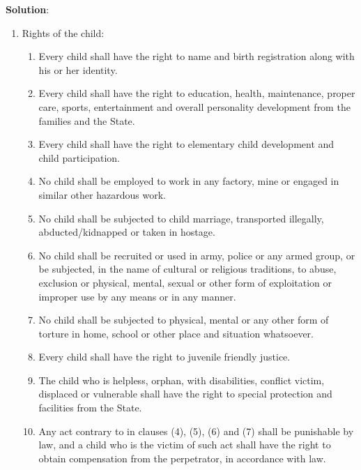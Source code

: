 \documentclass[
  openany]{book}
\newenvironment{solution}{ {\bfseries Solution}:}{}
\begin{document}
\begin{questions}
\begin{solution}
\begin{enumerate}
\item Rights of the child:
\begin{enumerate}
\item Every child shall have the right to name and birth registration along with his or her identity.
\item Every child shall have the right to education, health, maintenance, proper care, sports, entertainment and overall personality development from the families and the State.
\item Every child shall have the right to elementary child development and child participation.
\item No child shall be employed to work in any factory, mine or engaged in similar other hazardous work.
\item No child shall be subjected to child marriage, transported illegally, abducted/kidnapped or taken in hostage.
\item No child shall be recruited or used in army, police or any armed group, or be subjected, in the name of cultural or religious traditions, to abuse, exclusion or physical, mental, sexual or other form of exploitation or improper use by any means or in any manner.
\item No child shall be subjected to physical, mental or any other form of torture in home, school or other place and situation whatsoever.
\item Every child shall have the right to juvenile friendly justice.
\item The child who is helpless, orphan, with disabilities, conflict victim, displaced or vulnerable shall have the right to special protection and facilities from the State.
\item Any act contrary to in clauses (4), (5), (6) and (7) shall be punishable by law, and a child who is the victim of such act shall have the right to obtain compensation from the perpetrator, in accordance with law.
\end{enumerate}


\end{enumerate}
\end{solution}
\end{questions}
\end{document}
